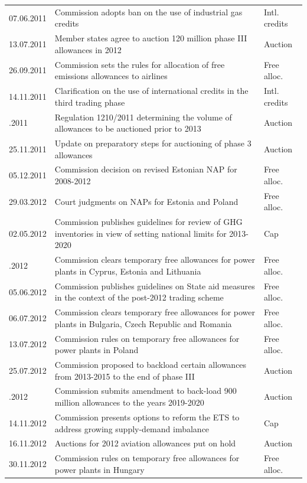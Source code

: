 \documentclass[
]{article}
\begin{document}
\begin{longtable}[l]{l>{\raggedright\arraybackslash}p{35em}l}
07.06.2011 & Commission adopts ban on the use of industrial gas credits & Intl. credits\\
13.07.2011 & Member states agree to auction 120 million phase III allowances in 2012 & Auction\\
26.09.2011 & Commission sets the rules for allocation of free emissions allowances to airlines & Free alloc.\\
14.11.2011 & Clarification on the use of international credits in the third trading phase & Intl. credits\\
\addlinespace
23.11.2011 & Regulation 1210/2011 determining the volume of allowances to be auctioned prior to 2013 & Auction\\
25.11.2011 & Update on preparatory steps for auctioning of phase 3 allowances & Auction\\
05.12.2011 & Commission decision on revised Estonian NAP for 2008-2012 & Free alloc.\\
29.03.2012 & Court judgments on NAPs for Estonia and Poland & Free alloc.\\
02.05.2012 & Commission publishes guidelines for review of GHG inventories in view of setting national limits for 2013-2020 & Cap\\
\addlinespace
23.05.2012 & Commission clears temporary free allowances for power plants in Cyprus, Estonia and Lithuania & Free alloc.\\
05.06.2012 & Commission publishes guidelines on State aid measures in the context of the post-2012 trading scheme & Free alloc.\\
06.07.2012 & Commission clears temporary free allowances for power plants in Bulgaria, Czech Republic and Romania & Free alloc.\\
13.07.2012 & Commission rules on temporary free allowances for power plants in Poland & Free alloc.\\
25.07.2012 & Commission proposed to backload certain allowances from 2013-2015 to the end of phase III & Auction\\
\addlinespace
12.11.2012 & Commission submits amendment to back-load 900 million allowances to the years 2019-2020 & Auction\\
14.11.2012 & Commission presents options to reform the ETS to address growing supply-demand imbalance & Cap\\
16.11.2012 & Auctions for 2012 aviation allowances put on hold & Auction\\
30.11.2012 & Commission rules on temporary free allowances for power plants in Hungary & Free alloc.\\

\end{longtable}
\end{document}
